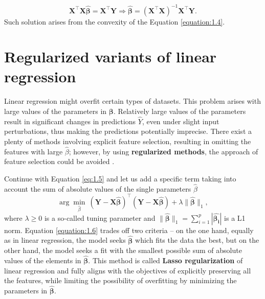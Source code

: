 \begin{equation}
    \mathbf{X}^{\top}\mathbf{X}\bm{\hat{\beta}} = \mathbf{X}^{\top}\mathbf{Y} \Rightarrow \bm{\hat{\beta}} = (\mathbf{X}^{\top}\mathbf{X})^{-1}\mathbf{X}^{\top}\mathbf{Y}.
\end{equation}
Such solution arises from the convexity of the Equation \eqref{equation:1.4}.

\section{Regularized variants of linear regression}

Linear regression might overfit certain types of datasets. This problem arises with
large values of the parameters in $\bm{\beta}$. Relatively large values of the parameters result in significant changes in predictions
$\hat{Y}$, even under slight input perturbations, thus making the predictions potentially imprecise. There exist a plenty of methods involving explicit feature selection, resulting
in omitting the features with large $\hat{\beta}$; however, by using \textbf{regularized methods}, the approach of feature selection could be avoided \cite{islp,skiena}.

Continue with Equation \eqref{eq:1.5} and let us add a specific term taking into account the sum of absolute values of the single parameters $\hat{\beta}$  
\begin{equation}
    \label{equation:1.6}
     \arg \min_{\hat{\beta}} \> (\bm{Y} - \textbf{X}\bm{\hat{\beta}})^\top(\bm{Y} - \textbf{X}\bm{\hat{\beta}}) + \lambda \|\bm{\hat{\beta}}\|_1,
\end{equation}
where $\lambda \geq 0$ is a so-called tuning parameter and $\|\bm{\hat{\beta}}\|_1 = \sum_{i=1}^{p}|\bm{\hat{\beta_{i}}}|$ is a L1 norm. Equation \eqref{equation:1.6} trades off two criteria – on the one hand, equally as in linear regression, the model seeks
$\bm{\hat{\beta}}$ which fits the data the best, but on the other hand, the model seeks a fit with the smallest possible sum of absolute values of the elements in $\bm{\hat{\beta}}$.
This method is called \textbf{Lasso regularization} of linear regression and fully aligns with the objectives of explicitly preserving all the features, while limiting the possibility of overfitting 
by minimizing the parameters in $\bm{\hat{\beta}}$.

